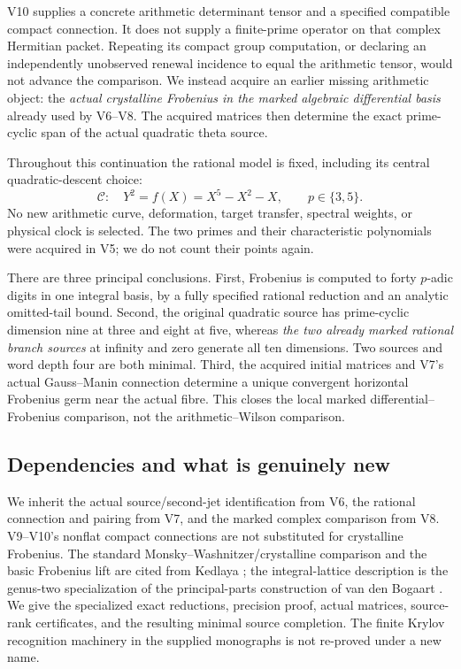 \documentclass[11pt]{article}
\theoremstyle{definition}
\theoremstyle{remark}
\begin{document}
V10 supplies a concrete arithmetic determinant tensor and a specified
compatible compact connection. It does not supply a finite-prime operator
on that complex Hermitian packet. Repeating its compact group computation,
or declaring an independently unobserved renewal incidence to equal the
arithmetic tensor, would not advance the comparison. We instead acquire
an earlier missing arithmetic object: the \emph{actual crystalline
Frobenius in the marked algebraic differential basis} already used by
V6--V8. The acquired matrices then determine the exact prime-cyclic span
of the actual quadratic theta source.

Throughout this continuation the rational model is fixed, including its
central quadratic-descent choice:
\begin{equation}
 \mathcal C:\quad Y^2=f(X)=X^5-X^2-X,
 \qquad p\in\{3,5\}.
 \label{eq:v11-curve}
\end{equation}
No new arithmetic curve, deformation, target transfer, spectral weights,
or physical clock is selected. The two primes and their characteristic
polynomials were acquired in V5; we do not count their points again.

There are three principal conclusions. First, Frobenius is computed to
forty $p$-adic digits in one integral basis, by a fully specified rational
reduction and an analytic omitted-tail bound. Second, the original
quadratic source has prime-cyclic dimension nine at three and eight at
five, whereas \emph{the two already marked rational branch sources}
at infinity and zero generate all ten dimensions. Two sources and word
depth four are both minimal. Third, the acquired initial matrices and
V7's actual Gauss--Manin connection determine a unique convergent
horizontal Frobenius germ near the actual fibre. This closes the local
marked differential--Frobenius comparison, not the arithmetic--Wilson
comparison.

\subsection{Dependencies and what is genuinely new}
We inherit the actual source/second-jet identification from V6, the
rational connection and pairing from V7, and the marked complex comparison
from V8. V9--V10's nonflat compact connections are not substituted for
crystalline Frobenius. The standard Monsky--Washnitzer/crystalline
comparison and the basic Frobenius lift are cited from Kedlaya
\cite{KedlayaMW}; the integral-lattice description is the genus-two
specialization of the principal-parts construction of van den Bogaart
\cite{BogaartBasis}. We give the specialized exact reductions, precision
proof, actual matrices, source-rank certificates, and the resulting
minimal source completion. The finite Krylov recognition machinery in
the supplied monographs \cite{GT77,Arithmetic} is not re-proved under a
new name.
\end{document}
